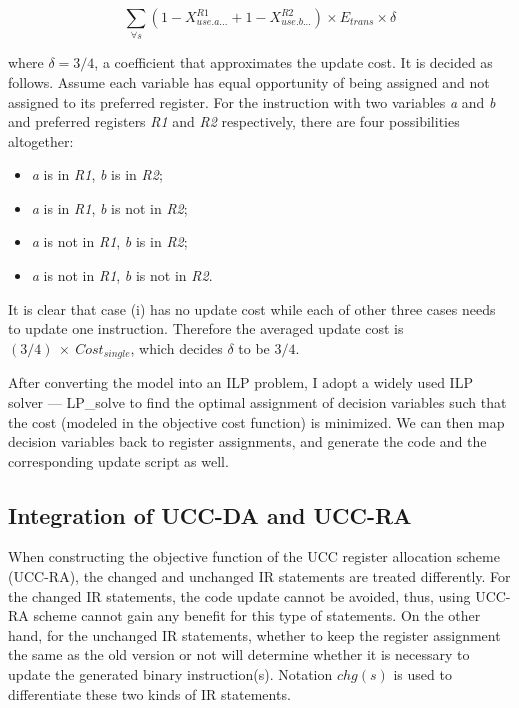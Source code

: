 \begin{small}
\begin{equation}
\sum_{\forall s}(1-X_{use.a...}^{R1} + 
1-X_{use.b...}^{R2})  \times E_{trans} \times \delta 
\end{equation}
\end{small}
\noindent

where $\delta=3/4$, a coefficient that approximates the update cost.
It is decided as follows. Assume each variable has equal opportunity
of being assigned and not assigned to its preferred register. For the
instruction with two variables {\it a} and {\it b} and preferred
registers {\it R1} and {\it R2} respectively, there are four
possibilities altogether: 
\begin{itemize}
	\item {\it a} is in {\it R1}, {\it b} is in {\it R2}; 
	\item {\it a} is in {\it R1}, {\it b} is not in {\it R2};
	\item {\it a} is not in {\it R1}, {\it b} is in {\it R2}; 
	\item {\it a} is not in {\it R1}, {\it b} is not in {\it R2}. 
\end{itemize}
It is clear that case
(i) has no update cost while each of other three cases needs to update
one instruction. Therefore the averaged update cost is $
(3/4)~\times~Cost_{single}$, which decides $\delta$ to be $3/4$.

After converting the model into an ILP problem, I adopt a widely used
ILP solver --- LP\_solve \cite{lpsolve} to find the optimal assignment
of decision variables such that the cost (modeled in the objective
cost function) is minimized.  We can then map decision variables back to
register assignments, and generate the code and the corresponding
update script as well.

\subsection{Integration of UCC-DA and UCC-RA}\label{integration}

When constructing the objective function of the UCC register allocation scheme (UCC-RA),
the changed and unchanged IR statements are treated differently.
For the changed IR statements, the code update cannot be avoided, thus, using UCC-RA scheme cannot
gain any benefit for this type of statements. On the other hand, for the unchanged IR statements, 
whether to keep the register assignment the same as the old version or not will determine whether
it is necessary to update the generated binary instruction(s).  Notation $chg(s)$ is used to
differentiate these two kinds of IR statements.

